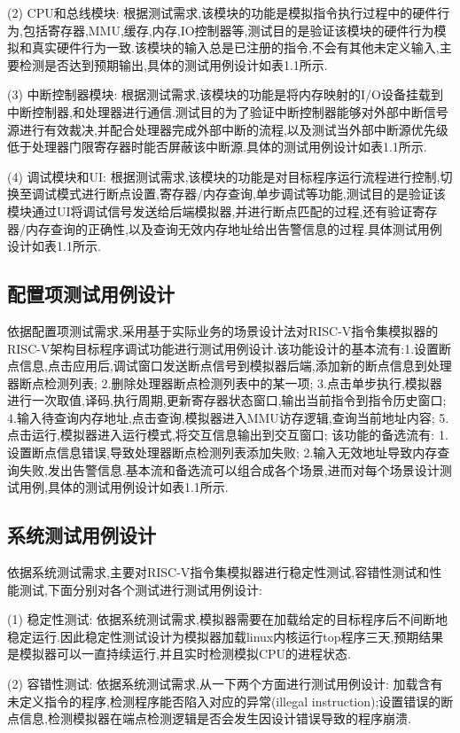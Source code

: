 (2) CPU和总线模块: 根据测试需求,该模块的功能是模拟指令执行过程中的硬件行为,包括寄存器,MMU,缓存,内存,IO控制器等,测试目的是验证该模块的硬件行为模拟和真实硬件行为一致.该模块的输入总是已注册的指令,不会有其他未定义输入,主要检测是否达到预期输出,具体的测试用例设计如表1.1所示.


(3) 中断控制器模块: 根据测试需求,该模块的功能是将内存映射的I/O设备挂载到中断控制器,和处理器进行通信.测试目的为了验证中断控制器能够对外部中断信号源进行有效裁决,并配合处理器完成外部中断的流程,以及测试当外部中断源优先级低于处理器门限寄存器时能否屏蔽该中断源.具体的测试用例设计如表1.1所示.


(4) 调试模块和UI: 根据测试需求,该模块的功能是对目标程序运行流程进行控制,切换至调试模式进行断点设置,寄存器/内存查询,单步调试等功能,测试目的是验证该模块通过UI将调试信号发送给后端模拟器,并进行断点匹配的过程,还有验证寄存器/内存查询的正确性,以及查询无效内存地址给出告警信息的过程.具体测试用例设计如表1.1所示.

\subsection{配置项测试用例设计}
依据配置项测试需求,采用基于实际业务的场景设计法对RISC-V指令集模拟器的RISC-V架构目标程序调试功能进行测试用例设计.该功能设计的基本流有:1.设置断点信息,点击应用后,调试窗口发送断点信号到模拟器后端,添加新的断点信息到处理器断点检测列表; 2.删除处理器断点检测列表中的某一项; 3.点击单步执行,模拟器进行一次取值,译码,执行周期,更新寄存器状态窗口,输出当前指令到指令历史窗口; 4.输入待查询内存地址,点击查询,模拟器进入MMU访存逻辑,查询当前地址内容; 5.点击运行,模拟器进入运行模式,将交互信息输出到交互窗口; 该功能的备选流有: 1.设置断点信息错误,导致处理器断点检测列表添加失败; 2.输入无效地址导致内存查询失败,发出告警信息.基本流和备选流可以组合成各个场景,进而对每个场景设计测试用例,具体的测试用例设计如表1.1所示.

\subsection{系统测试用例设计}
依据系统测试需求,主要对RISC-V指令集模拟器进行稳定性测试,容错性测试和性能测试,下面分别对各个测试进行测试用例设计:


(1)	稳定性测试: 依据系统测试需求,模拟器需要在加载给定的目标程序后不间断地稳定运行.因此稳定性测试设计为模拟器加载linux内核运行top程序三天,预期结果是模拟器可以一直持续运行,并且实时检测模拟CPU的进程状态.


(2)	容错性测试: 依据系统测试需求,从一下两个方面进行测试用例设计: 加载含有未定义指令的程序,检测程序能否陷入对应的异常(illegal instruction);设置错误的断点信息,检测模拟器在端点检测逻辑是否会发生因设计错误导致的程序崩溃.


